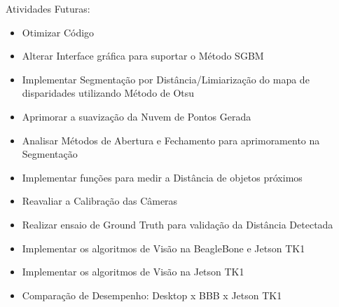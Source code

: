 

Atividades Futuras:

\begin{itemize}
	\item Otimizar Código
	\item Alterar Interface gráfica para suportar o Método SGBM
	\item Implementar Segmentação por Distância/Limiarização do mapa de disparidades utilizando Método de Otsu
	\item Aprimorar a suavização da Nuvem de Pontos Gerada
	\item Analisar Métodos de Abertura e Fechamento para aprimoramento na Segmentação
	\item Implementar funções para medir a Distância de objetos próximos
	\item Reavaliar a Calibração das Câmeras	
	\item Realizar ensaio de Ground Truth para validação da Distância Detectada
	\item Implementar os algoritmos de Visão na BeagleBone e Jetson TK1
	\item Implementar os algoritmos de Visão na Jetson TK1
	\item Comparação de Desempenho: Desktop x BBB x Jetson TK1
\end{itemize}









